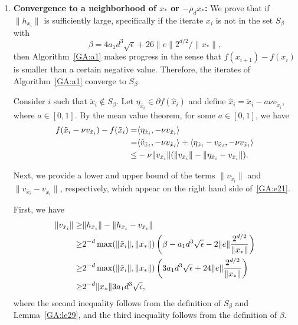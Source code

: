 \begin{enumerate}
\item {\bf Convergence to a neighborhood of $x_*$ or $- \rho_d x_*$:}
We prove that if $\|h_{x_i}\|$ is sufficiently large, specifically if the iterate $x_i$ is not in the set $S_{\beta}$ with
$$
\beta = 4 a_1 d^3 \sqrt{\epsilon} + 26 \|e\| 2^{d/2} / \|x_*\|,
$$
then Algorithm~\ref{GA:a1} makes progress in the sense that $f(x_{i + 1}) - f(x_i)$ is smaller than a certain negative value. Therefore, the iterates of Algorithm~\ref{GA:a1} converge to $S_\beta$. %

Consider $i$ such that $\tilde{x}_i \notin S_\beta$.
Let $\eta_{\hat{x}_i} \in \partial f(\hat{x}_i)$ and define $\hat{x}_i = \tilde{x}_i - a \nu {v}_{\tilde{x}_i}$, where $a \in [0, 1]$. By the mean value  theorem, for some  $a \in [0, 1]$, we have
\begin{align}
f(\tilde{x}_i - \nu {v}_{\tilde{x}_i}) - f(\tilde{x}_i) =& \inner[]{\eta_{\hat{x}_i}}{- \nu {v}_{\tilde{x}_i}} %
\nonumber \\
=& \inner[]{\tilde{v}_{\tilde{x}_i}}{- \nu {v}_{\tilde{x}_i}} + \inner[]{\eta_{\hat{x}_i} - {v}_{\tilde{x}_i}}{- \nu {v}_{\tilde{x}_i}} \nonumber \\
\leq& - \nu \|{v}_{\tilde{x}_i}\| ( \|{v}_{\tilde{x}_i}\| - \|\eta_{\hat{x}_i} - {v}_{\tilde{x}_i}\| ). \label{GA:e21}
\end{align}

Next, we provide a lower and upper bound of the terms $\|{v}_{\tilde{x}_i}\|$ and $\|v_{\hat{x}_{i}} - {v}_{\tilde{x}_i}\|$, respectively, which appear on the right hand side of~\eqref{GA:e21}.

First, we have
\begin{align}
\|{v}_{\tilde{x}_i}\| \geq& \|h_{\tilde{x}_i}\| - \|h_{\tilde{x}_i} - {v}_{\tilde{x}_i}\| \nonumber \\
\geq& 2^{-d} \max(\|\tilde{x}_i\|, \|x_*\|) \left( \beta - a_1 d^3 \sqrt{\epsilon}  - 2 \|e\| \frac{2^{d/2}}{\|x_*\|} \right) \nonumber \\
\geq& 2^{-d} \max(\|\tilde{x}_i\|, \|x_*\|) \left( 3 a_1 d^3 \sqrt{\epsilon}  + 24 \|e\| \frac{2^{d/2}}{\|x_*\|} \right) \label{GA:le30} \\
\geq& 2^{-d} \|x_*\| 3 a_1 d^3 \sqrt{\epsilon}, \label{GA:e71}
\end{align}
where the second inequality follows from the definition of $S_\beta$ and Lemma~\ref{GA:le29}, %
and the third inequality follows from the definition of $\beta$.


\end{enumerate}
